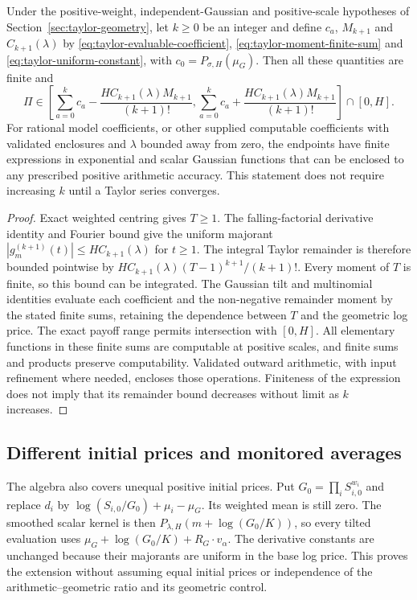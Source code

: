 \begin{theorem}
\label{thm:finite-gaussian-price-certificate}
Under the positive-weight, independent-Gaussian and positive-scale hypotheses
of Section~\ref{sec:taylor-geometry}, let $k\geq0$ be an integer and define
$c_a$, $M_{k+1}$ and $C_{k+1}(\lambda)$ by
\eqref{eq:taylor-evaluable-coefficient},
\eqref{eq:taylor-moment-finite-sum} and
\eqref{eq:taylor-uniform-constant}, with $c_0=P_{\sigma,H}(\mu_G)$.
Then all these quantities are finite and
\[
 \Pi\in\left[\sum_{a=0}^k c_a-
 \frac{H C_{k+1}(\lambda)M_{k+1}}{(k+1)!},
 \sum_{a=0}^k c_a+
 \frac{H C_{k+1}(\lambda)M_{k+1}}{(k+1)!}\right]\cap[0,H].
\]
For rational model coefficients, or other supplied computable coefficients
with validated enclosures and $\lambda$ bounded away from zero, the endpoints
have finite expressions in exponential and scalar Gaussian functions that
can be enclosed to any prescribed positive arithmetic accuracy. This
statement does not require increasing $k$ until a Taylor series converges.
\end{theorem}
\begin{proof}
Exact weighted centring gives $T\geq1$. The falling-factorial derivative
identity and Fourier bound give the uniform majorant
$|g_m^{(k+1)}(t)|\leq H C_{k+1}(\lambda)$ for $t\geq1$.
The integral Taylor remainder is therefore bounded pointwise by
$H C_{k+1}(\lambda)(T-1)^{k+1}/(k+1)!$.
Every moment of $T$ is finite, so this bound can be integrated.
The Gaussian tilt and multinomial identities evaluate each coefficient
and the non-negative remainder moment by the stated finite sums, retaining
the dependence between $T$ and the geometric log price. The exact payoff
range permits intersection with $[0,H]$.
All elementary functions in these finite sums are computable at positive
scales, and finite sums and products preserve computability. Validated
outward arithmetic, with input refinement where needed, encloses those
operations. Finiteness of the expression does not imply that its remainder
bound decreases without limit as $k$ increases.
\end{proof}

\subsection{Different initial prices and monitored averages}
\label{sec:taylor-financial-extension}

The algebra also covers unequal positive initial prices. Put
$G_0=\prod_i S_{i,0}^{w_i}$ and replace
$d_i$ by $\log(S_{i,0}/G_0)+\mu_i-\mu_G$.
Its weighted mean is still zero. The smoothed scalar kernel is then
$P_{\lambda,H}(m+\log(G_0/K))$, so every tilted evaluation uses
$\mu_G+\log(G_0/K)+R_G\cdot v_\alpha$.
The derivative constants are unchanged because their majorants are uniform
in the base log price. This proves the extension without assuming equal
initial prices or independence of the arithmetic--geometric ratio and its
geometric control.

